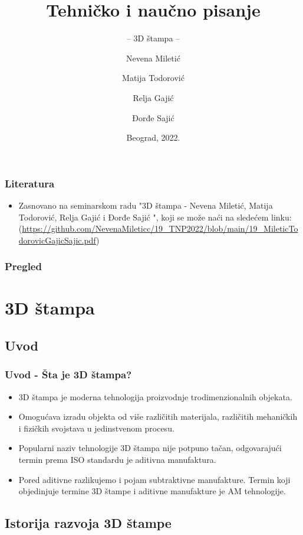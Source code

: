 \documentclass{beamer}
\title{Tehničko i naučno pisanje}
\subtitle{-- 3D štampa --}
\author{Nevena Miletić\and Matija Todorović\\ \and Relja Gajić \and Đorđe Sajić}
\institute{Matematički fakultet\\Univerzitet u Beogradu}
\date{
	\footnotesize{Beograd, 2022.}	
}
\begin{document}
\begin{frame}
	\thispagestyle{empty}
	\titlepage
\end{frame}

\addtocounter{framenumber}{-1}

\begin{frame}[fragile]\frametitle{Literatura}
	\begin{itemize}
		\item Zasnovano na seminarskom radu "3D štampa - Nevena Miletić, Matija Todorović, Relja Gajić i Đorđe Sajić ", koji se može naći na sledećem linku:
		(\url{https://github.com/NevenaMileticc/19_TNP2022/blob/main/19_MileticTodorovicGajicSajic.pdf})
	\end{itemize}
\end{frame}

\begin{frame}
	\frametitle{Pregled} 
	\tableofcontents[] 
\end{frame}
\section{3D štampa}
\subsection{Uvod}

\begin{frame}[fragile]\frametitle{Uvod - Šta je 3D štampa?}
	\begin{itemize}
	    \item 3D štampa je moderna tehnologija proizvodnje trodimenzionalnih objekata. 
            \item Omogućava izradu objekta od više različitih materijala, različitih mehaničkih i fizičkih svojstava u jedinstvenom procesu. 
            \item Popularni naziv tehnologije 3D štampa nije potpuno tačan, odgovarajući termin prema ISO standardu je aditivna manufaktura. 
            \item Pored aditivne razlikujemo i pojam subtraktivne manufakture.
Termin koji objedinjuje termine 3D štampe i aditivne manufakture je AM tehnologije. 
	\end{itemize}
\end{frame}

\subsection{Istorija razvoja 3D štampe}
\end{document}
